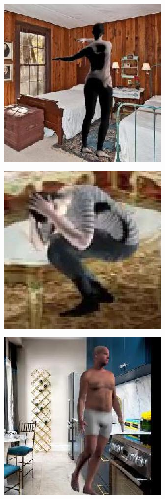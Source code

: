 \begin{figure}
\centering
\begin{subfigure}{.19\textwidth}
\centering
  \includegraphics[scale=0.3]{80_15_c0002_85.jpg}
\end{subfigure}
\begin{subfigure}{.19\textwidth}
  \centering
  \includegraphics[scale=0.3]{ung_77_09_c0001_67.jpg}
\end{subfigure}
\begin{subfigure}{.19\textwidth}
  \centering
  \includegraphics[scale=0.3]{ung_91_62_c0003_87.jpg}

\end{subfigure}
\end{figure}
